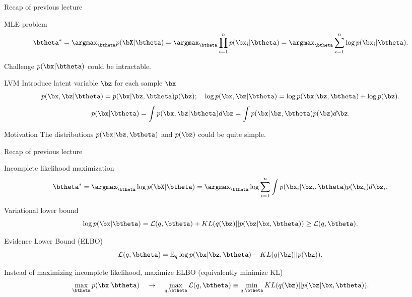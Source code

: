 

\begin{frame}
\titlepage
\end{frame}
\begin{frame}{Recap of previous lecture}
    \begin{block}{MLE problem}
    \vspace{-0.5cm}
    \[
        \btheta^* = \argmax_{\btheta} p(\bX | \btheta) = \argmax_{\btheta} \prod_{i=1}^n p(\bx_i | \btheta) = \argmax_{\btheta} \sum_{i=1}^n \log p(\bx_i | \btheta).
    \]
    \vspace{-0.5cm}
    \end{block}
    \begin{block}{Challenge}
    $p(\bx | \btheta)$ could be intractable.
    \end{block}
    \begin{block}{LVM}
    Introduce latent variable $\bz$ for each sample $\bx$
    \[
        p(\bx, \bz | \btheta) = p(\bx | \bz, \btheta) p(\bz); \quad 
        \log p(\bx, \bz | \btheta) = \log p(\bx | \bz, \btheta) + \log p(\bz).
    \]
    \[
        p(\bx | \btheta) = \int p(\bx, \bz | \btheta) d\bz = \int p(\bx | \bz, \btheta) p(\bz) d\bz.
    \]
    \end{block}
	\vspace{-0.3cm}
	\begin{block}{Motivation}
		The distributions $p(\bx | \bz, \btheta)$ and $p(\bz)$ could be quite simple.
	\end{block}
\end{frame}
\begin{frame}{Recap of previous lecture}
        \begin{block}{Incomplete likelihood maximization}
        \vspace{-0.7cm}
    	\[
    	        \btheta^* = \argmax_{\btheta} \log p(\bX| \btheta) = \argmax_{\btheta} \log \sum_{i=1}^n \int p(\bx_i| \bz_i, \btheta) p(\bz_i) d\bz_i.
    	\]
    	\vspace{-0.5cm}
	\end{block}
	\begin{block}{Variational lower bound}
		\[
		    \log p(\bx| \btheta) = \mathcal{L} (q, \btheta) + KL(q(\bz) || p(\bz|\bx, \btheta)) \geq \mathcal{L} (q, \btheta).
		\]
	\end{block}
	\begin{block}{Evidence Lower Bound (ELBO)}
	    \vspace{-0.3cm}
		\[
		    \mathcal{L} (q, \btheta) = \mathbb{E}_{q} \log p(\bx | \bz, \btheta) - KL (q(\bz) || p(\bz)).
		\]
	\end{block}
	Instead of maximizing incomplete likelihood, maximize ELBO (equivalently minimize KL)
	\[
	    \max_{\btheta} p(\bx | \btheta) \quad \rightarrow \quad \max_{q, \btheta} \mathcal{L} (q, \btheta) \equiv \min_{q, \btheta} KL(q(\bz) || p(\bz|\bx, \btheta)).
	\]
	    
\end{frame}
